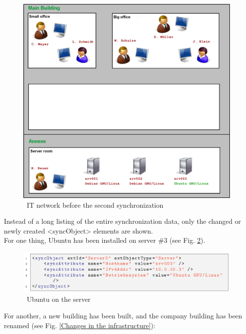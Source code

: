 \documentclass[a4paper,10pt]{book}
\begin{document}
\begin{figure}[htb!]
  \centering
  \includegraphics[scale=.21]{Screenshot/Mustermann_snapshot02_03-en.png}
  \caption{\label{IT network before the second synchronization} \ IT network before the second synchronization}
\end{figure}
\newline
Instead of a long listing of the entire synchronization data, only the changed or newly created \textless syncObject\textgreater
elements are shown.
\newline\\
For one thing, Ubuntu has been installed on server \#3 (see Fig. \ref{Ubuntu on the server}).
\newline
\begin{figure}[htb!]
  \centering
  \includegraphics[scale=.75]{Screenshot/SyncAPI_Fallstudie_10-en.png}
  \caption{\label{Ubuntu on the server} \ Ubuntu on the server}
\end{figure}
\newline
For another, a new building has been built, and the company building has been renamed (see Fig. \ref{Changes in the infrastructure}):
\end{document}
